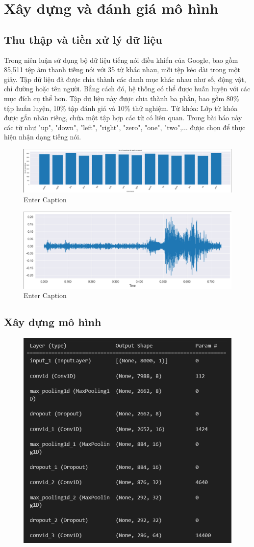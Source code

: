 \chapter{Xây dựng và đánh giá mô hình}

\section{Thu thập và tiền xử lý dữ liệu}

Trong niên luận sử dụng bộ dữ liệu tiếng nói điều 
khiển của Google, bao gồm 85,511 tệp âm thanh 
tiếng nói với 35 từ khác nhau, mỗi tệp kéo dài trong một giây. Tập dữ liệu đã được chia thành các danh mục khác nhau như số, động vật, chỉ đường hoặc tên người. Bằng cách đó, hệ thống có thể được huấn 
luyện với các mục đích cụ thể hơn. Tập dữ liệu này 
được chia thành ba phần, bao gồm 80\% tập huấn 
luyện, 10\% tập đánh giá và 10\% thử nghiệm.
Từ khóa: Lớp từ khóa được gắn nhãn riêng, 
chứa một tập hợp các từ có liên quan. Trong bài báo
này các từ như "up", "down", "left", "right", "zero", "one", "two",... được chọn để thực hiện nhận dạng tiếng nói.
\begin{figure}
    \centering
    \includegraphics[width=0.5\linewidth]{images/data.png}
    \caption{Enter Caption}
    \label{fig:enter-label}
\end{figure}

\begin{figure}
    \centering
    \includegraphics[width=0.5\linewidth]{spectogram.png}
    \caption{Enter Caption}
    \label{fig:enter-label}
\end{figure}
\section{Xây dựng mô hình}

\begin{figure}
    \centering
    \includegraphics[width=0.5\linewidth]{images/model_1.png}
    
    
\end{figure}

